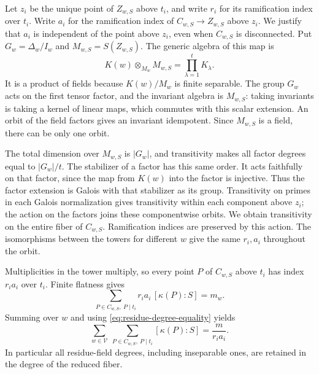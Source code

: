 Let $z_i$ be the unique point of $Z_{w,S}$ above $t_i$, and write $r_i$
for its ramification index over $t_i$. Write $a_i$ for the ramification
index of $C_{w,S}\to Z_{w,S}$ above $z_i$. We justify that $a_i$ is
independent of the point above $z_i$, even when $C_{w,S}$ is disconnected.
Put $G_w=\Delta_w/I_w$ and $M_{w,S}=S(Z_{w,S})$. The generic algebra
of this map is
\[
 K(w)\otimes_{M_w}M_{w,S}=\prod_{\lambda=1}^t K_\lambda.
\]
It is a product of fields because $K(w)/M_w$ is finite separable.
The group $G_w$ acts on the first tensor factor, and the invariant
algebra is $M_{w,S}$: taking invariants is taking a kernel of linear
maps, which commutes with this scalar extension. An orbit of the
field factors gives an invariant idempotent. Since $M_{w,S}$ is a
field, there can be only one orbit.

The total dimension over $M_{w,S}$ is $|G_w|$, and transitivity makes
all factor degrees equal to $|G_w|/t$. The stabilizer of a factor has
this same order. It acts faithfully on that factor, since the map
from $K(w)$ into the factor is injective. Thus the factor extension
is Galois with that stabilizer as its group. Transitivity on primes
in each Galois normalization gives transitivity within each component
above $z_i$; the action on the factors joins these componentwise
orbits. We obtain transitivity on the entire fiber of $C_{w,S}$.
Ramification indices are preserved by this action. The isomorphisms
between the towers for different $w$ give the same $r_i,a_i$ throughout
the orbit.

Multiplicities in the tower multiply, so every point $P$ of $C_{w,S}$
above $t_i$ has index $r_i a_i$ over $t_i$. Finite flatness gives
\[
 \sum_{P\in C_{w,S},\ P\mid t_i}
    r_i a_i\,[\kappa(P):S]=m_w.
\]
Summing over $w$ and using \eqref{eq:residue-degree-equality} yields
\begin{equation}\label{eq:reduced-special-fiber-degree}
 \sum_{w\in\mathcal V}\ 
 \sum_{P\in C_{w,S},\ P\mid t_i}[\kappa(P):S]
 =\frac{m}{r_i a_i}.
\end{equation}
In particular all residue-field degrees, including inseparable ones,
are retained in the degree of the reduced fiber.

